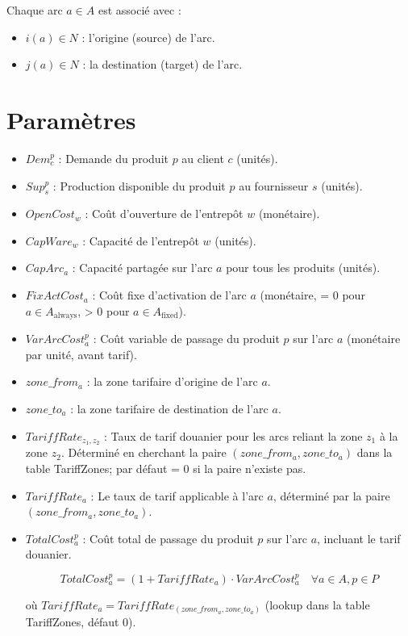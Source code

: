 \documentclass{article}
\begin{document}
Chaque arc $a \in A$ est associé avec :
\begin{itemize}
    \item $i(a) \in N$ : l'origine (source) de l'arc.
    \item $j(a) \in N$ : la destination (target) de l'arc.
\end{itemize}

\section{Paramètres}

\begin{itemize}
    \item $Dem_c^p$ : Demande du produit $p$ au client $c$ (unités).
    \item $Sup_s^p$ : Production disponible du produit $p$ au fournisseur $s$ (unités).
    \item $OpenCost_w$ : Coût d'ouverture de l'entrepôt $w$ (monétaire).
    \item $CapWare_w$ : Capacité de l'entrepôt $w$ (unités).
    \item $CapArc_a$ : Capacité partagée sur l'arc $a$ pour tous les produits (unités).
    \item $FixActCost_a$ : Coût fixe d'activation de l'arc $a$
    \quad (monétaire, = 0 pour $a \in A_{\text{always}}$, > 0 pour $a \in A_{\text{fixed}}$).
    \item $VarArcCost_a^p$ : Coût variable de passage du produit $p$ sur l'arc $a$ (monétaire par unité, avant tarif).
    \item $zone\_from_a$ : la zone tarifaire d'origine de l'arc $a$.
    \item $zone\_to_a$ : la zone tarifaire de destination de l'arc $a$.
    \item $TariffRate_{z_1, z_2}$ : Taux de tarif douanier pour les arcs reliant la zone $z_1$ à la zone $z_2$.
    \quad Déterminé en cherchant la paire $(zone\_from_a, zone\_to_a)$ dans la table TariffZones;
    \quad par défaut = 0 si la paire n'existe pas.
    \item $TariffRate_a$ : Le taux de tarif applicable à l'arc $a$, déterminé par la paire
    \quad $(zone\_from_a, zone\_to_a)$.
    \item $TotalCost_a^p$ : Coût total de passage du produit $p$ sur l'arc $a$, incluant le tarif douanier.

    \[
        TotalCost_a^p = (1 + TariffRate_a) \cdot VarArcCost_a^p \quad \forall a \in A, p \in P
    \]

    où $TariffRate_a = TariffRate_{(zone\_from_a, zone\_to_a)}$ (lookup dans la table TariffZones, défaut 0).

\end{itemize}
\end{document}
